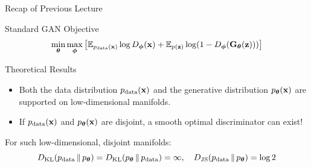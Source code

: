 \documentclass{beamer}
\begin{document}
\begin{frame}{Recap of Previous Lecture}
	\begin{block}{Standard GAN Objective}
		\vspace{-0.2cm}
		\[
		\min_{\boldsymbol{\theta}} \max_{\boldsymbol{\phi}} \left[ \mathbb{E}_{p_{\text{data}}(\mathbf{x})} \log D_{\boldsymbol{\phi}}(\mathbf{x}) + \mathbb{E}_{p(\mathbf{z})} \log (1 - D_{\boldsymbol{\phi}}(\mathbf{G}_{\boldsymbol{\theta}}(\mathbf{z}))) \right]
		\]
		\vspace{-0.4cm}
	\end{block}
	\vspace{-0.1cm}
	\begin{block}{Theoretical Results}
		\begin{itemize}
			\item Both the data distribution $p_{\text{data}}(\mathbf{x})$ and the generative distribution $p_{\boldsymbol{\theta}}(\mathbf{x})$ are supported on low-dimensional manifolds.
			\item If $p_{\text{data}}(\mathbf{x})$ and $p_{\boldsymbol{\theta}}(\mathbf{x})$ are disjoint, a smooth optimal discriminator can exist!
		\end{itemize}
		For such low-dimensional, disjoint manifolds:
		\vspace{-0.2cm}
		\[
			D_\mathrm{KL}(p_{\text{data}}\,\|\,p_{\boldsymbol{\theta}}) = D_\mathrm{KL}(p_{\boldsymbol{\theta}}\,\|\,p_{\text{data}}) = \infty, \quad D_\mathrm{JS}(p_{\text{data}}\,\|\,p_{\boldsymbol{\theta}}) = \log 2
		\]
	\end{block}
\end{frame}
\end{document}
